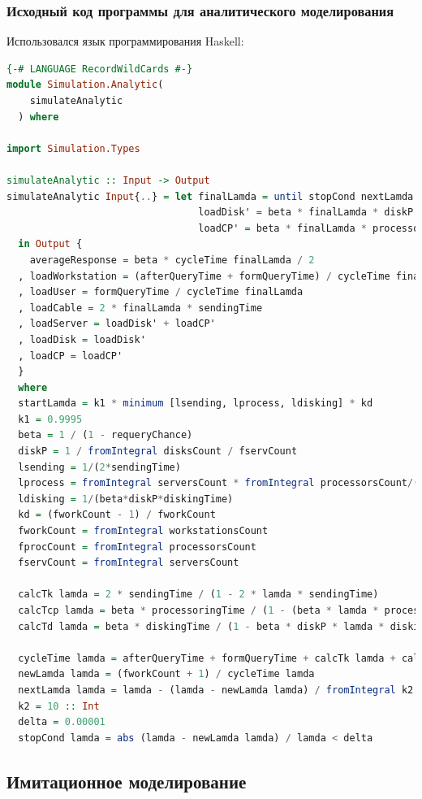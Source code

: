 \documentclass[russian,utf8,emptystyle]{eskdtext}
\begin{document}
\subsubsection{Исходный код программы для аналитического моделирования}

Использовался язык программирования Haskell:
\begin{lstlisting}[language=Haskell]
{-# LANGUAGE RecordWildCards #-}
module Simulation.Analytic(
    simulateAnalytic
  ) where
  
import Simulation.Types

simulateAnalytic :: Input -> Output
simulateAnalytic Input{..} = let finalLamda = until stopCond nextLamda startLamda
                                 loadDisk' = beta * finalLamda * diskP * diskingTime
                                 loadCP' = beta * finalLamda * processoringTime / fprocCount / fservCount
  in Output {
    averageResponse = beta * cycleTime finalLamda / 2
  , loadWorkstation = (afterQueryTime + formQueryTime) / cycleTime finalLamda
  , loadUser = formQueryTime / cycleTime finalLamda
  , loadCable = 2 * finalLamda * sendingTime
  , loadServer = loadDisk' + loadCP'
  , loadDisk = loadDisk'
  , loadCP = loadCP'
  }
  where
  startLamda = k1 * minimum [lsending, lprocess, ldisking] * kd
  k1 = 0.9995
  beta = 1 / (1 - requeryChance)
  diskP = 1 / fromIntegral disksCount / fservCount
  lsending = 1/(2*sendingTime)
  lprocess = fromIntegral serversCount * fromIntegral processorsCount/(beta*processoringTime)
  ldisking = 1/(beta*diskP*diskingTime)
  kd = (fworkCount - 1) / fworkCount
  fworkCount = fromIntegral workstationsCount
  fprocCount = fromIntegral processorsCount 
  fservCount = fromIntegral serversCount
  
  calcTk lamda = 2 * sendingTime / (1 - 2 * lamda * sendingTime)
  calcTcp lamda = beta * processoringTime / (1 - (beta * lamda * processoringTime / (fservCount*fprocCount)) ** (fservCount*fprocCount))
  calcTd lamda = beta * diskingTime / (1 - beta * diskP * lamda * diskingTime)
  
  cycleTime lamda = afterQueryTime + formQueryTime + calcTk lamda + calcTcp lamda + calcTd lamda
  newLamda lamda = (fworkCount + 1) / cycleTime lamda
  nextLamda lamda = lamda - (lamda - newLamda lamda) / fromIntegral k2
  k2 = 10 :: Int
  delta = 0.00001
  stopCond lamda = abs (lamda - newLamda lamda) / lamda < delta  
\end{lstlisting}

\subsection{Имитационное моделирование}
\end{document}
